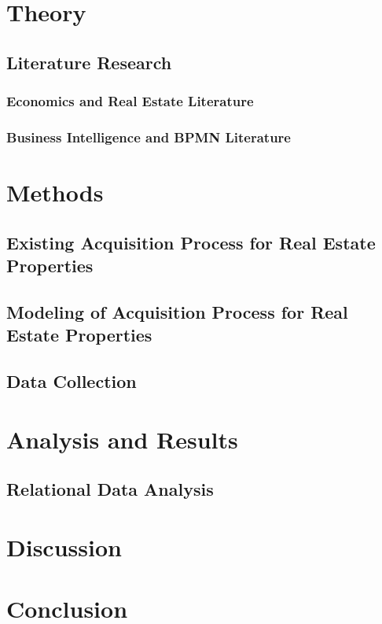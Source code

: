 \documentclass{seal_thesis}
\begin{document}
\nocite{*}

\chapter{Theory}
\section{Literature Research}
\subsection{Economics and Real Estate Literature}
\subsection{Business Intelligence and BPMN Literature}

\chapter{Methods}
\section{Existing Acquisition Process for Real Estate Properties}
\section{Modeling of Acquisition Process for Real Estate Properties}
\section{Data Collection}

\chapter{Analysis and Results}
\section{Relational Data Analysis}

\chapter{Discussion}

\chapter{Conclusion}
\appendix

\backmatter



\end{document}
